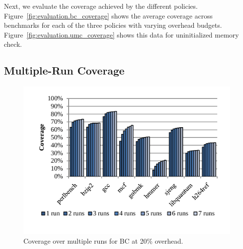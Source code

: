 Next, we evaluate the coverage achieved by the different policies.
Figure~\ref{fig:evaluation.bc_coverage} shows the average coverage across
benchmarks for each of the three policies with varying overhead budgets.
Figure~\ref{fig:evaluation.umc_coverage} shows this data for uninitialized
memory check.

\subsection{Multiple-Run Coverage}

\begin{figure}
  \begin{center}
    \includegraphics[width=\columnwidth]{figs/data_multirun_coverage.pdf}
    \vspace{-0.2in}
    \caption{Coverage over multiple runs for BC at 20\% overhead.}
    \label{fig:evaluation.multirun}
    \vspace{-0.1in}
  \end{center}
\end{figure}


